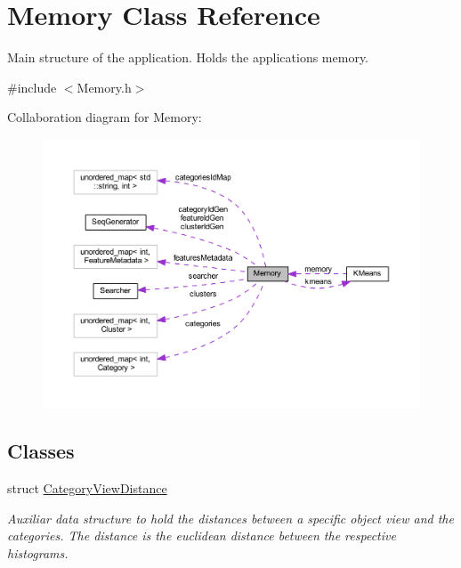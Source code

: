 \hypertarget{class_memory}{}\section{Memory Class Reference}
\label{class_memory}


Main structure of the application. Holds the applications\textquotesingle{} memory.  




{\ttfamily \#include $<$Memory.\+h$>$}



Collaboration diagram for Memory\+:
\nopagebreak
\begin{figure}[H]
\begin{center}
\leavevmode
\includegraphics[width=350pt]{class_memory__coll__graph}
\end{center}
\end{figure}
\subsection*{Classes}
\begin{DoxyCompactItemize}
\item 
struct \hyperlink{struct_memory_1_1_category_view_distance}{Category\+View\+Distance}
\begin{DoxyCompactList}\small\item\em Auxiliar data structure to hold the distances between a specific object view and the categories. The distance is the euclidean distance between the respective histograms. \end{DoxyCompactList}\end{DoxyCompactItemize}
